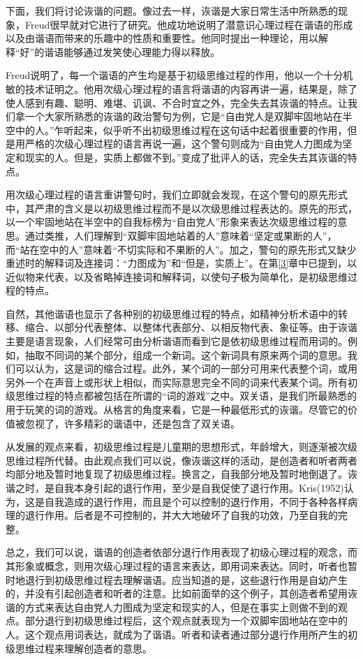 \documentclass[UTF8,10pt,a4paper,openany]{book}
\begin{document}
下面，我们将讨论诙谐的问题。像过去一样，诙谐是大家日常生活中所熟悉的现象，Freud很早就对它进行了研究。他成功地说明了潜意识心理过程在谐语的形成以及由谐语而带来的乐趣中的性质和重要性。他同时提出一种理论，用以解释“好”的谐语能够通过发笑使心理能力得以释放。

Freud说明了，每一个谐语的产生均是基于初级思维过程的作用，他以一个十分机敏的技术证明之。他用次级心理过程的语言将谐语的内容再讲一遍，结果是，除了使人感到有趣、聪明、难堪、讥讽、不合时宜之外，完全失去其诙谐的特点。让我们拿一个大家所熟悉的诙谐的政治警句为例，它是“自由党人是双脚牢固地站在半空中的人。”乍听起来，似乎听不出初级思维过程在这句话中起着很重要的作用，但是用严格的次级心理过程的语言再说一遍，这个警句则成为“自由党人力图成为坚定和现实的人。但是，实质上都做不到。”变成了批评人的话，完全失去其诙谐的特点。

用次级心理过程的语言重讲警句时，我们立即就会发现，在这个警句的原先形式中，其严肃的含义是以初级思维过程而不是以次级思维过程表达的。原先的形式，以一个牢固地站在半空中的自我标榜为“自由党人”形象来表达次级思维过程的意思。通过类推，人们理解到“双脚牢固地站着的人”意味着“坚定或果断的人”，而“站在空中的人”意味着“不切实际和不果断的人”。加之，警句的原先形式又缺少重述时的解释词及连接词：“力图成为”和“但是，实质上”。在第\ref{3}章中已提到，以近似物来代表，以及省略掉连接词和解释词，以使句子极为简单化，是初级思维过程的特点。

自然，其他谐语也显示了各种别的初级思维过程的特点，如精神分析术语中的转移、缩合、以部分代表整体、以整体代表部分、以相反物代表、象征等。由于诙谐主要是语言现象，人们经常可由分析谐语而看到它是依初级思维过程而用词的。例如，抽取不同词的某个部分，组成一个新词。这个新词具有原来两个词的意思。我们可以认为，这是词的缩合过程。此外，某个词的一部分可用来代表整个词，或用另外一个在声音上或形状上相似，而实际意思完全不同的词来代表某个词。所有初级思维过程的特点都被包括在所谓的“词的游戏”之中。双关语，是我们所最熟悉的用于玩笑的词的游戏。从格言的角度来看，它是一种最低形式的诙谐。尽管它的价值被忽视了，许多精彩的谐语中，还是包含了双关语。

从发展的观点来看，初级思维过程是儿童期的思想形式，年龄增大，则逐渐被次级思维过程所代替。由此观点我们可以说，像诙谐这样的活动，是创造者和听者两者均部分地及暂时地复现了初级思维过程。换言之，自我部分地及暂时地倒退了。诙谐之时，是自我本身引起的退行作用，至少是自我促使了退行作用。Kris(1952)认为，这是自我造成的退行作用，而且是个可以控制的退行作用，不同于各种各样病理的退行作用。后者是不可控制的，并大大地破坏了自我的功效，乃至自我的完整。

总之，我们可以说，谐语的创造者依部分退行作用表现了初级心理过程的观念，而其形象或概念，则用次级心理过程的语言来表达，即用词来表达。同时，听者也暂时地退行到初级思维过程去理解谐语。应当知道的是，这些退行作用是自幼产生的，并没有引起创造者和听者的注意。比如前面举的这个例子，其创造者希望用诙谐的方式来表达自由党人力图成为坚定和现实的人，但是在事实上则做不到的观点。部分退行到初级思维过程后，这个观点就表现为一个双脚牢固地站在空中的人。这个观点用词表达，就成为了谐语。听者和读者通过部分退行作用所产生的初级思维过程来理解创造者的意思。
\end{document}
